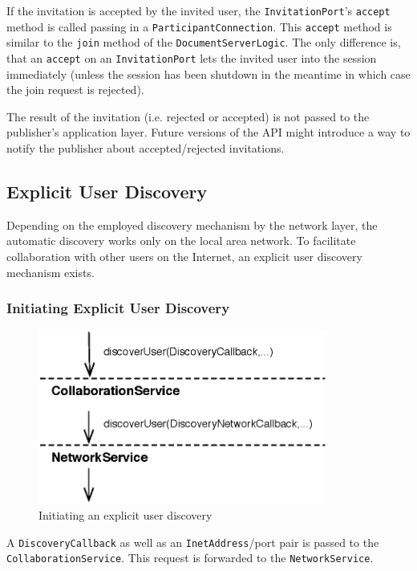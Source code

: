 If the invitation is accepted by the invited user, the \texttt{InvitationPort}'s 
\texttt{accept} method is called passing in a \texttt{ParticipantConnection}.
This \texttt{accept} method is similar to the \texttt{join} method
of the \texttt{DocumentServerLogic}. The only difference is, that an
\texttt{accept} on an \texttt{InvitationPort} lets the invited user into
the session immediately (unless the session has been shutdown in the meantime
in which case the join request is rejected).

The result of the invitation (i.e. rejected or accepted) is not passed to the 
publisher's application layer. 
Future versions of the API might introduce a way to notify the publisher about
accepted/rejected invitations.


\subsection{Explicit User Discovery}
Depending on the employed discovery mechanism by the network layer, the
automatic discovery works only on the local area network. To facilitate
collaboration with other users on the Internet, an explicit user discovery
mechanism exists. 

\subsubsection{Initiating Explicit User Discovery}
\begin{figure}[H]
 \centering
 \includegraphics[width=9.49cm,height=5.72cm]{../images/finalreport/architecture_flows/explicitdiscovery.eps}
 \caption{Initiating an explicit user discovery}
 \label{fig:archoverview.flow.explicitdiscovery}
\end{figure}

A \texttt{Discovery\-Callback} as well as an \texttt{Inet\-Address}/port pair 
is passed to the \texttt{Collaboration\-Service}. This request is forwarded
to the \texttt{Network\-Service}.

